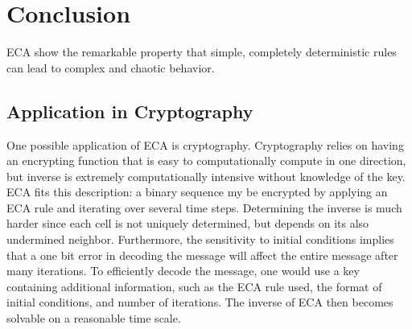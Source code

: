 \section{Conclusion}

ECA show the remarkable property that simple, completely deterministic rules can lead to complex and chaotic behavior.  

\subsection{Application in Cryptography}

One possible application of ECA is cryptography.  Cryptography relies on having an encrypting function that is easy to computationally compute in one direction, but inverse is extremely computationally intensive without knowledge of the key.  ECA fits this description: a binary sequence my be encrypted by applying an ECA rule and iterating over several time steps.  Determining the inverse is much harder since each cell is not uniquely determined, but depends on its also undermined neighbor.  Furthermore, the sensitivity to initial conditions implies that a one bit error in decoding the message will affect the entire message after many iterations.  To efficiently decode the message, one would use a key containing additional information, such as the ECA rule used, the format of initial conditions, and number of iterations.  The inverse of ECA then becomes solvable on a reasonable time scale.  

